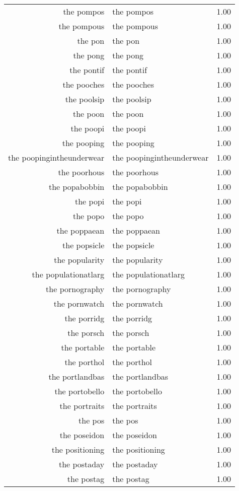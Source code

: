 \begin{table}[ht]
\begin{tabular}{rlr}
  the pompos & the pompos & 1.00 \\ 
  the pompous & the pompous & 1.00 \\ 
  the pon & the pon & 1.00 \\ 
  the pong & the pong & 1.00 \\ 
  the pontif & the pontif & 1.00 \\ 
  the pooches & the pooches & 1.00 \\ 
  the poolsip & the poolsip & 1.00 \\ 
  the poon & the poon & 1.00 \\ 
  the poopi & the poopi & 1.00 \\ 
  the pooping & the pooping & 1.00 \\ 
  the poopingintheunderwear & the poopingintheunderwear & 1.00 \\ 
  the poorhous & the poorhous & 1.00 \\ 
  the popabobbin & the popabobbin & 1.00 \\ 
  the popi & the popi & 1.00 \\ 
  the popo & the popo & 1.00 \\ 
  the poppaean & the poppaean & 1.00 \\ 
  the popsicle & the popsicle & 1.00 \\ 
  the popularity & the popularity & 1.00 \\ 
  the populationatlarg & the populationatlarg & 1.00 \\ 
  the pornography & the pornography & 1.00 \\ 
  the pornwatch & the pornwatch & 1.00 \\ 
  the porridg & the porridg & 1.00 \\ 
  the porsch & the porsch & 1.00 \\ 
  the portable & the portable & 1.00 \\ 
  the porthol & the porthol & 1.00 \\ 
  the portlandbas & the portlandbas & 1.00 \\ 
  the portobello & the portobello & 1.00 \\ 
  the portraits & the portraits & 1.00 \\ 
  the pos & the pos & 1.00 \\ 
  the poseidon & the poseidon & 1.00 \\ 
  the positioning & the positioning & 1.00 \\ 
  the postaday & the postaday & 1.00 \\ 
  the postag & the postag & 1.00 \\ 

\end{tabular}
\end{table}

